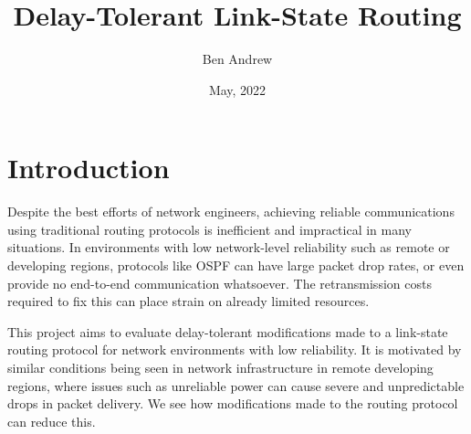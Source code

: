 \documentclass[withindex,glossary,openany]{cam-thesis}
\title{Delay-Tolerant Link-State Routing}
\author{Ben Andrew}
\date{May, 2022}
\begin{document}
\frontmatter{}




\pagebreak

\chapter{Introduction}



Despite the best efforts of network engineers, achieving reliable communications using traditional routing protocols is inefficient and impractical in many situations. In environments with low network-level reliability such as remote or developing regions, protocols like OSPF can have large packet drop rates, or even provide no end-to-end communication whatsoever. The retransmission costs required to fix this can place strain on already limited resources.

This project aims to evaluate delay-tolerant modifications made to a link-state routing protocol for network environments with low reliability. It is motivated by similar conditions being seen in network infrastructure in remote developing regions, where issues such as unreliable power can cause severe and unpredictable drops in packet delivery. We see how modifications made to the routing protocol can reduce this.



\end{document}
